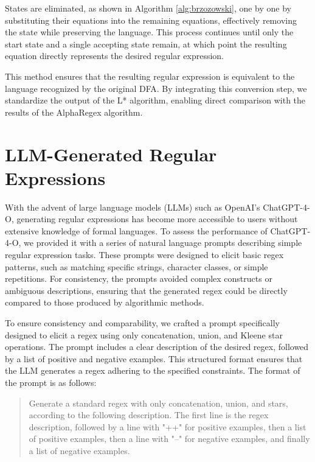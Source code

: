 \indent\indent States are eliminated, as shown in Algorithm \ref{alg:brzozowski}, one by one by substituting their equations into the remaining equations, effectively removing the state while preserving the language. This process continues until only the start state and a single accepting state remain, at which point the resulting equation directly represents the desired regular expression.

\indent\indent This method ensures that the resulting regular expression is equivalent to the language recognized by the original DFA. By integrating this conversion step, we standardize the output of the L* algorithm, enabling direct comparison with the results of the AlphaRegex algorithm. \cite{brzozowski_1964_derivatives}

\vspace{-0.4em}
\section{LLM-Generated Regular Expressions}
\vspace{-0.4em}

\indent\indent With the advent of large language models (LLMs) such as OpenAI's ChatGPT-4-O, generating regular expressions has become more accessible to users without extensive knowledge of formal languages. To assess the performance of ChatGPT-4-O, we provided it with a series of natural language prompts describing simple regular expression tasks. These prompts were designed to elicit basic regex patterns, such as matching specific strings, character classes, or simple repetitions. For consistency, the prompts avoided complex constructs or ambiguous descriptions, ensuring that the generated regex could be directly compared to those produced by algorithmic methods.

\indent\indent To ensure consistency and comparability, we crafted a prompt specifically designed to elicit a regex using only concatenation, union, and Kleene star operations. The prompt includes a clear description of the desired regex, followed by a list of positive and negative examples. This structured format ensures that the LLM generates a regex adhering to the specified constraints. The format of the prompt is as follows:


\begin{quote}
Generate a standard regex with only concatenation, union, and stars, according to the following description. The first line is the regex description, followed by a line with "++" for positive examples, then a list of positive examples, then a line with "--" for negative examples, and finally a list of negative examples.
\end{quote}

